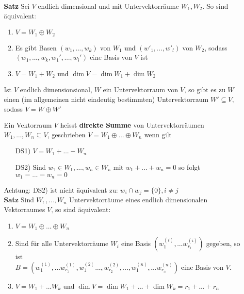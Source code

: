 \textbf{Satz} Sei $V$ endlich dimensional und mit Untervektorräume $W_1, W_2$. So sind äquivalent:
\begin{enumerate}[{(}a{)}]
\item $V = W_1 \oplus W_2$

\item   Es gibt Basen $(w_1, \ldots, w_k)$ von $W_1$ und $(w'_1, \ldots, w'_l)$ von $W_2$, sodass $(w_1, \ldots, w_k, w_1', \ldots , w_l')$ eine Basis von $V$ ist

\item  $V = W_1 + W_2$ und $\dim V = \dim W_1 + \dim W_2$
\end{enumerate}
Ist $V$ endlich dimensionsional, $W$ ein Untervektorraum von $V$, so gibt es zu $W$ einen (im allgemeinen nicht eindeutig bestimmten) Untervektorraum $W' \subseteq V$, sodass $V = W \oplus W'$\\
\begin{mdframed}
Ein Vektorraum $V$ heisst \textbf{direkte Summe} von Untervektorräumen $W_1, \ldots, W_n \subseteq V$, geschrieben $ V = W_1 \oplus \ldots \oplus W_n$ wenn gilt 
\begin{itemize}
    \item[DS1)] $V = W_1 + \ldots + W_n$
    
    \item[DS2)] Sind $w_1 \in W_1, \ldots, w_n \in W_n$ mit $w_{1} + \ldots + w_{n} = 0$ so folgt $w_1 = \ldots = w_n = 0$
\end{itemize}
\end{mdframed}
Achtung: DS2) ist nicht äquivalent zu: $w_i \cap w_j = \{0\}, i\neq j$\\
\textbf{Satz} Sind $W_1, \ldots, W_n$ Untervektorräume eines endlich dimensionalen Vektorraumes $V$, so sind äquivalent:
\begin{enumerate}[{(}i{)}]
    \item   $V = W_1 \oplus \ldots \oplus W_n$
    
    \item   Sind für alle Untervektorräume $W_i$ eine Basis $(w_1^{(i)}, \ldots w_{r_i}^{(i)})$ gegeben, so ist\\
    $B = (w_1^{(1)}, \ldots w_{r_1}^{(1)}, w_1^{(2)} \ldots, w_{r_2}^{(2)}, \ldots, w_1^{(n)}, \ldots w_{r_n}^{(n)})$ eine Basis von $V$.
    
    \item $V = W_1 + \ldots W_k$ und $\dim V = \dim W_1 + \ldots + \dim W_k = r_{1} + \ldots + r_{n}$
\end{enumerate}
